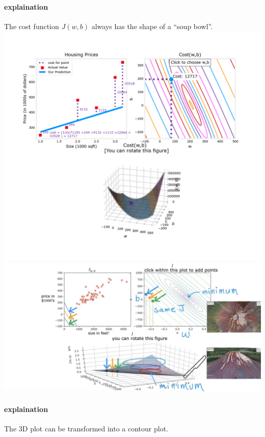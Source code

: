 \paragraph*{explaination}
The cost function $J(w, b)$ always has the shape of a ``soup bowl''.\\
\includegraphics[height=0.7\textheight]{images/2.2_5}
\vspace{2em}
\includegraphics[width=\textwidth]{images/2.2_3}
\paragraph*{explaination}
The 3D plot can be transformed into a contour plot.\par